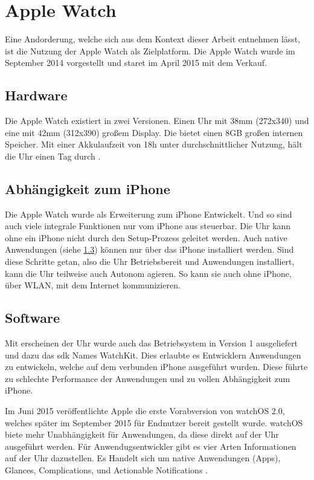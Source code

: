 \section{Apple Watch}
\label{ch:apple-watch}
Eine Andorderung, welche sich aus dem Kontext dieser Arbeit entnehmen lässt, ist die Nutzung der Apple Watch als Zielplatform. Die Apple Watch wurde im September 2014 vorgestellt und staret im April 2015 mit dem Verkauf.
\subsection{Hardware}
Die Apple Watch existiert in zwei Versionen. Einen Uhr mit 38mm (272x340) und eine mit 42mm (312x390) großem Display. Die bietet einen 8GB großen internen Speicher. Mit einer Akkulaufzeit von 18h unter durchschnittlicher Nutzung, hält die Uhr einen Tag durch \cite{Riches:2015aa}. 
\subsection{Abhängigkeit zum iPhone}
Die Apple Watch wurde als Erweiterung zum iPhone Entwickelt. Und so sind auch viele integrale Funktionen nur vom iPhone aus steuerbar. Die Uhr kann ohne ein iPhone nicht durch den Setup-Prozess geleitet werden. Auch native Anwendungen (siehe \ref{ch:watch_software}) können nur über das iPhone installiert werden. Sind diese Schritte getan, also die Uhr Betriebsbereit und Anwendungen installiert, kann die Uhr teilweise auch Autonom agieren. So kann sie auch ohne iPhone, über WLAN, mit dem Internet kommunizieren.

\subsection{Software}
\label{ch:watch_software}
Mit erscheinen der Uhr wurde auch das Betriebsystem in Version 1 ausgeliefert und dazu das \gls{sdk} Names WatchKit. Dies erlaubte es Entwicklern Anwendungen zu entwickeln, welche auf dem verbunden iPhone ausgeführt wurden. Diese führte zu schlechte Performance der Anwendungen und zu vollen Abhängigkeit zum iPhone.

Im Juni 2015 veröffentlichte Apple die erste Vorabversion von watchOS 2.0, welches später im September 2015 für Endnutzer bereit gestellt wurde. watchOS biete mehr Unabhängigkeit für Anwendungen, da diese direkt auf der Uhr ausgeführt werden. Für Anwendugsentwickler gibt es vier Arten Informationen auf der Uhr dazustellen. Es Handelt sich um native Anwendungen (Apps), Glances, Complications, und Actionable Notifications \cite{Apple:2015devAw}.

